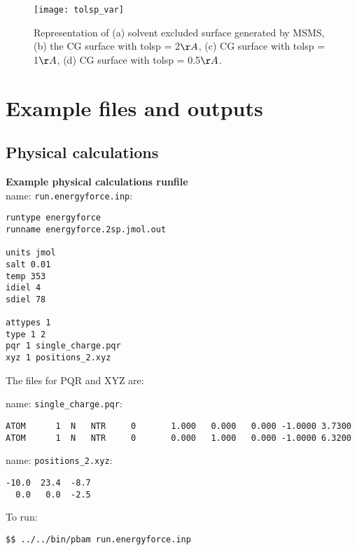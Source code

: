 \begin{figure}[!htbp]
  \centering
    \texttt{[image: tolsp\_var]}
    \caption{Representation of (a) solvent excluded surface generated by MSMS, (b) the CG surface with tolsp = 2\(\AA\), (c) CG surface with tolsp = 1\(\AA\), (d) CG surface with tolsp = 0.5\(\AA\).}
    \label{fig:pbsam_cart}
\end{figure}

\clearpage




\section{Example files and outputs}

\subsection{Physical calculations}

\textbf{Example physical calculations runfile} \\

name:  \texttt{run.energyforce.inp}:
\begin{lstlisting}[style = MyBash]
runtype energyforce
runname energyforce.2sp.jmol.out

units jmol
salt 0.01
temp 353
idiel 4 
sdiel 78

attypes 1
type 1 2
pqr 1 single_charge.pqr
xyz 1 positions_2.xyz
\end{lstlisting}
\medskip

The files for PQR and XYZ are: 

name:  \texttt{single\_charge.pqr}:
\begin{lstlisting}[style = MyBash]
ATOM      1  N   NTR     0       1.000   0.000   0.000 -1.0000 3.7300
ATOM      1  N   NTR     0       0.000   1.000   0.000 -1.0000 6.3200
\end{lstlisting}

\medskip

name:  \texttt{positions\_2.xyz}:
\begin{lstlisting}[style = MyBash]
-10.0  23.4  -8.7
  0.0   0.0  -2.5
\end{lstlisting}
\medskip

To run: 
\begin{lstlisting}[style = MyBash]
$$ ../../bin/pbam run.energyforce.inp
\end{lstlisting}
\medskip

